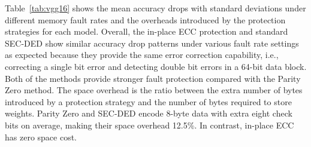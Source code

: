 \documentclass{article}
\newcommand{\TODO}[1]{{\it \color{blue}\{TODO: #1\}}}
\begin{document}
Table~\ref{tab:vgg16} shows the mean accuracy drops with standard deviations under different memory fault rates and the overheads introduced by the protection strategies for each model. 
Overall, the in-place ECC protection and standard SEC-DED show similar accuracy drop patterns under various fault rate settings as expected because they provide the same error correction capability, i.e., correcting a single bit error and detecting double bit errors in a 64-bit data block. Both of the methods provide stronger fault protection compared with the Parity Zero method. 
% 
The space overhead is the ratio between the extra number of bytes introduced by a protection strategy and the number of bytes required to store weights. Parity Zero and SEC-DED encode 8-byte data with extra eight check bits on average, making their space overhead 12.5\%. In contrast, in-place ECC has zero space cost.  



\end{document}
